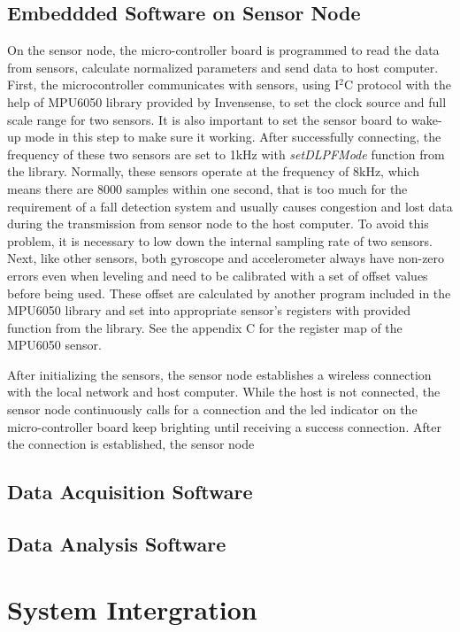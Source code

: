 \documentclass[letterpaper,12pt,titlepage,oneside,final]{book}
\begin{document}
\subsection{Embeddded Software on Sensor Node}
On the sensor node, the micro-controller board is programmed to read the data from sensors, calculate normalized parameters and send data to host computer. First, the microcontroller communicates with sensors, using I$^{2}$C protocol with the help of MPU6050 library provided by Invensense\textregistered, to set the clock source and full scale range for two sensors. It is also important to set the sensor board to wake-up mode in this step to make sure it working.  After successfully connecting, the frequency of these two sensors are set to 1kHz with \textit{setDLPFMode} function from the library. Normally, these sensors operate at the frequency of 8kHz, which means there are 8000 samples within one second, that is too much for the requirement of a fall detection system and usually causes congestion and lost data during the transmission from sensor node to the host computer. To avoid this problem, it is necessary to low down the internal sampling rate of two sensors. 
Next, like other sensors, both gyroscope and accelerometer always have non-zero errors even when leveling and need to be calibrated with a set of offset values before being used. These offset are calculated by another program included in the MPU6050 library and set into appropriate sensor's registers with provided function from the library. See the appendix C for the register map of the MPU6050 sensor. \par
After initializing the sensors, the sensor node establishes a wireless connection with the local network and host computer. While the host is not connected, the sensor node continuously calls for a connection and the led indicator on the micro-controller board keep brighting until receiving a success connection. After the connection is established, the sensor node 
\subsection{Data Acquisition Software}

\subsection{Data Analysis Software}

\section{System Intergration}
\end{document}
